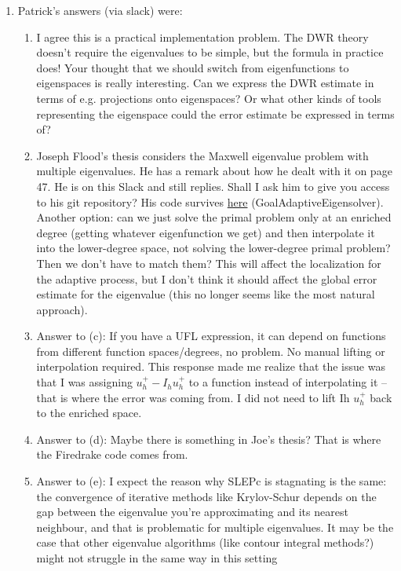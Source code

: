 \documentclass[12pt,a4paper]{article}
\begin{document}
\begin{enumerate}
\begin{enumerate}
    \item With SLEPc default tolerance, an eigensolve stagnates and won't converge near \texttt{1e-8}. To overcome this issue, I set \texttt{eps\_tol} to \texttt{1e-8}. In doing so, have I glazed over an underlying issue? 
    \end{enumerate}

    \item Patrick's answers (via slack) were:
    \begin{enumerate}
        \item I agree this is a practical implementation problem. The DWR theory doesn't require the eigenvalues to be simple, but the formula in practice does! Your thought that we should switch from eigenfunctions to eigenspaces is really interesting. Can we express the DWR estimate in terms of e.g. projections onto eigenspaces? Or what other kinds of tools representing the eigenspace could the error estimate be expressed in terms of?

        \item Joseph Flood's thesis considers the Maxwell eigenvalue problem with multiple eigenvalues. He has a remark about how he dealt with it on page 47. He is on this Slack and still replies. Shall I ask him to give you access to his git repository? His code survives \href{https://github.com/firedrakeproject/firedrake/blob/pefarrell/goal-adaptive-eigensolver/firedrake/adaptive_variational_solver.py }{here} (GoalAdaptiveEigensolver). Another option: can we just solve the primal problem only at an enriched degree (getting whatever eigenfunction we get) and then interpolate it into the lower-degree space, not solving the lower-degree primal problem? Then we don't have to match them? This will affect the localization for the adaptive process, but I don't think it should affect the global error estimate for the eigenvalue (this no longer seems like the most natural approach).

        \item Answer to (c): If you have a UFL expression, it can depend on functions from different function spaces/degrees, no problem. No manual lifting or interpolation required. This response made me realize that the issue was that I was assigning $u_h^+ - I_h u_h^+$ to a function instead of interpolating it -- that is where the error was coming from. I did not need to lift Ih $u_h^+$ back to the enriched space. 

        \item Answer to (d): Maybe there is something in Joe's thesis? That is where the Firedrake code comes from.
        
        \item Answer to (e): I expect the reason why SLEPc is stagnating is the same: the convergence of iterative methods like Krylov-Schur depends on the gap between the eigenvalue you're approximating and its nearest neighbour, and that is problematic for multiple eigenvalues. It may be the case that other eigenvalue algorithms (like contour integral methods?) might not struggle in the same way in this setting
    \end{enumerate}
\end{enumerate}
\end{document}
